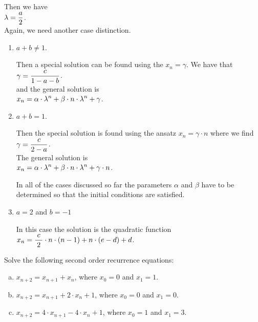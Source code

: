 \begin{enumerate}
      Then we have 
      \\[0.2cm]
      \hspace*{1.3cm}
      $\displaystyle \lambda = \frac{a}{2}$.
      \\[0.2cm]
      Again, we need another case distinction.
      \begin{enumerate}
      \item $a + b \not= 1$.

            Then a special solution can be found using the   $x_n = \gamma$.
            We have that
            \\[0.2cm]
            \hspace*{1.3cm}
            $\displaystyle \gamma = \frac{c}{1 - a - b}$.
            \\[0.2cm]
            and the general solution is
            \\[0.2cm]
            \hspace*{1.3cm}
            $\displaystyle x_{n} = \alpha \cdot \lambda^n + \beta \cdot n \cdot \lambda^n + \gamma$.
      \item $a + b = 1$.

            Then the special solution is found using the ansatz $x_n = \gamma \cdot n$ where we find
            \\[0.2cm]
            \hspace*{1.3cm}
            $\displaystyle \gamma = \frac{c}{2 - a}$.
            \\[0.2cm]
            The general solution is 
            \\[0.2cm]
            \hspace*{1.3cm}
            $\displaystyle x_{n} = \alpha \cdot \lambda^n + \beta \cdot n \cdot \lambda^n + \gamma \cdot n$.
            
            In all of the cases discussed so far the parameters $\alpha$ and $\beta$ have to be determined so
            that the initial conditions are satisfied.

       \item $a = 2$ and $b = -1$

            In this case the solution is the quadratic function
            \\[0.2cm]
            \hspace*{1.3cm}
            $x_n = \displaystyle \frac{\;c\;}{2} \cdot n \cdot (n-1) + n \cdot (e - d) + d$.
      \end{enumerate}
\end{enumerate}


\exercise
Solve the following second order recurrence equations:
\begin{enumerate}[(a)]
\item $x_{n+2} = x_{n+1} + x_n$, \quad where $x_0 = 0$ and $x_1 = 1$.  
\item $x_{n+2} = x_{n+1} + 2 \cdot x_n + 1$, \quad where $x_0 = 0$ and $x_1 = 0$.  
\item $x_{n+2} = 4 \cdot x_{n+1} - 4 \cdot x_n + 1$, \quad where $x_0 = 1$ and $x_1 = 3$.  \eox
\end{enumerate}

